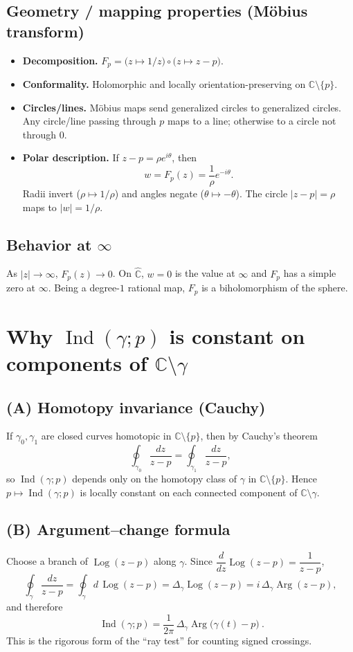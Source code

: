 \documentclass[11pt]{article}
\newcommand{\C}{\mathbb{C}}
\newcommand{\Chat}{\widehat{\mathbb{C}}}
\DeclareMathOperator{\Ind}{Ind}
\DeclareMathOperator{\Log}{Log}
\DeclareMathOperator{\Arg}{Arg}
\begin{document}
\subsection*{Geometry / mapping properties (Möbius transform)}
\begin{itemize}[leftmargin=2em]
	\item \textbf{Decomposition.} \(F_p = \big(z\mapsto 1/z\big)\circ \big(z\mapsto z-p\big)\).
	\item \textbf{Conformality.} Holomorphic and locally orientation-preserving on $\C\setminus\{p\}$.
	\item \textbf{Circles/lines.} Möbius maps send generalized circles to generalized circles.
	Any circle/line passing through $p$ maps to a line; otherwise to a circle not through $0$.
	\item \textbf{Polar description.} If \(z-p=\rho e^{i\theta}\), then
	\[
	w=F_p(z)=\frac{1}{\rho}e^{-i\theta}.
	\]
	Radii invert ($\rho\mapsto 1/\rho$) and angles negate ($\theta\mapsto -\theta$).
	The circle $|z-p|=\rho$ maps to $|w|=1/\rho$.
\end{itemize}

\subsection*{Behavior at \(\infty\)}
As $|z|\to\infty$, \(F_p(z)\to 0\). On $\Chat$, $w=0$ is the value at $\infty$ and $F_p$ has a simple zero at $\infty$.
Being a degree-$1$ rational map, $F_p$ is a biholomorphism of the sphere.

\section*{Why \(\Ind(\gamma;p)\) is constant on components of \(\C\setminus\gamma\)}

\subsection*{(A) Homotopy invariance (Cauchy)}
If $\gamma_0,\gamma_1$ are closed curves homotopic in $\C\setminus\{p\}$, then by Cauchy's theorem
\[
\oint_{\gamma_0}\frac{dz}{z-p}=\oint_{\gamma_1}\frac{dz}{z-p},
\]
so $\Ind(\gamma;p)$ depends only on the homotopy class of $\gamma$ in $\C\setminus\{p\}$.
Hence $p\mapsto \Ind(\gamma;p)$ is locally constant on each connected component of $\C\setminus\gamma$.

\subsection*{(B) Argument--change formula}
Choose a branch of $\Log(z-p)$ along $\gamma$. Since $\dfrac{d}{dz}\Log(z-p)=\dfrac{1}{z-p}$,
\[
\oint_{\gamma}\frac{dz}{z-p}
=\oint_{\gamma} d\,\Log(z-p)
=\Delta_{\gamma}\Log(z-p)
=i\,\Delta_{\gamma}\Arg(z-p),
\]
and therefore
\[
\boxed{\ \Ind(\gamma;p)=\frac{1}{2\pi}\,\Delta_{\gamma}\Arg\big(\gamma(t)-p\big)\ }.
\]
This is the rigorous form of the “ray test” for counting signed crossings.
\end{document}
